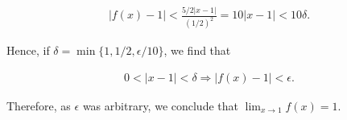 \documentclass[
  10pt,
  a4paper]{article}
\theoremstyle{plain}
\theoremstyle{definition}
\theoremstyle{plain}
\theoremstyle{plain}
\theoremstyle{plain}
\theoremstyle{plain}
\theoremstyle{definition}
\theoremstyle{definition}
\theoremstyle{remark}
\theoremstyle{remark}
\begin{document}
\begin{align*}
\lvert f(x) - 1 \rvert < \frac{5/2 \lvert x - 1 \rvert}{\left(1/2\right)^2} = 10\lvert x - 1 \rvert < 10\delta.
\end{align*}

Hence, if \(\delta = \min\lbrace 1 , 1/2, \epsilon/10\rbrace\), we find that

\begin{align*}
0<\lvert x - 1 \rvert < \delta \Longrightarrow \lvert f(x) - 1 \rvert < \epsilon.
\end{align*}

Therefore, as \(\epsilon\) was arbitrary, we conclude that \(\lim_{x \to 1} f(x) = 1.\)
\end{document}
